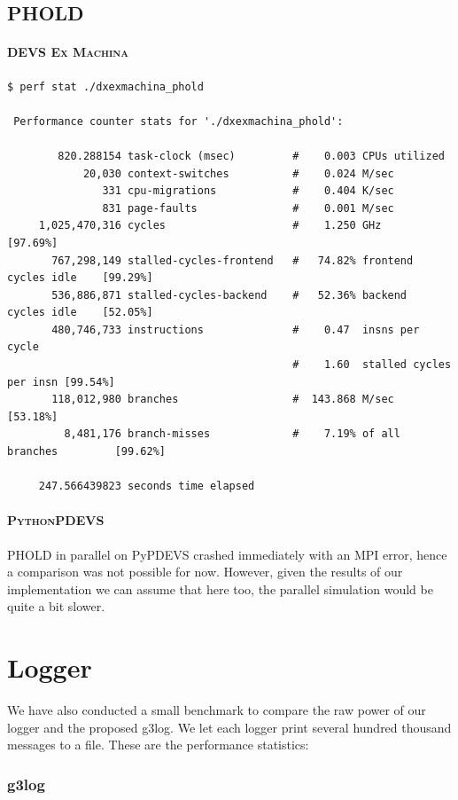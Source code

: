 \documentclass[8pt,a4paper]{report}
\begin{document}
\subsection{PHOLD}
\paragraph{\textsc{DEVS Ex Machina}}
\begin{Verbatim}[fontsize=\small]
$ perf stat ./dxexmachina_phold 

 Performance counter stats for './dxexmachina_phold':

        820.288154 task-clock (msec)         #    0.003 CPUs utilized          
            20,030 context-switches          #    0.024 M/sec                  
               331 cpu-migrations            #    0.404 K/sec                  
               831 page-faults               #    0.001 M/sec                  
     1,025,470,316 cycles                    #    1.250 GHz                     [97.69%]
       767,298,149 stalled-cycles-frontend   #   74.82% frontend cycles idle    [99.29%]
       536,886,871 stalled-cycles-backend    #   52.36% backend  cycles idle    [52.05%]
       480,746,733 instructions              #    0.47  insns per cycle        
                                             #    1.60  stalled cycles per insn [99.54%]
       118,012,980 branches                  #  143.868 M/sec                   [53.18%]
         8,481,176 branch-misses             #    7.19% of all branches         [99.62%]

     247.566439823 seconds time elapsed
\end{Verbatim}
\paragraph{\textsc{PythonPDEVS}}
PHOLD in parallel on PyPDEVS crashed immediately with an MPI error, hence a comparison was not possible for now. However, given the results of our implementation we can assume that here too, the parallel simulation would be quite a bit slower.

\section{Logger}
We have also conducted a small benchmark to compare the raw power of our logger and the proposed g3log.
We let each logger print several hundred thousand messages to a file. These are the performance statistics:
\subsubsection{g3log}

\end{document}
